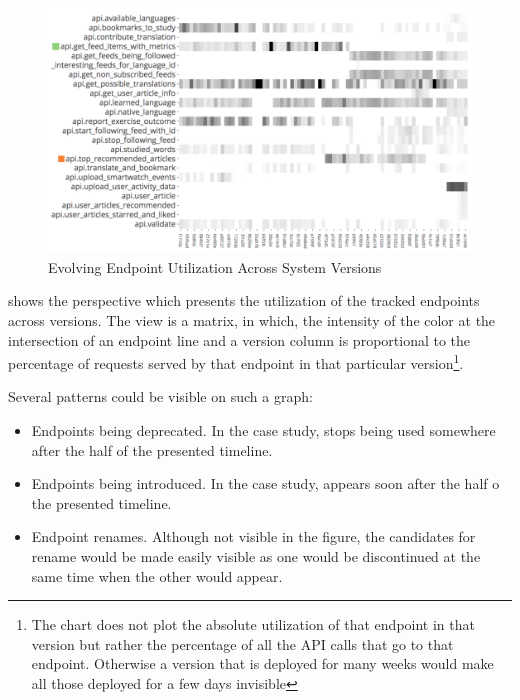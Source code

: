     \begin{figure}[h!]
      \centering
      \includegraphics[width=\linewidth]{utilization-evolution.pdf}
      \caption{Evolving Endpoint Utilization Across System Versions}
      \label{fig:mv-util}
    \end{figure}

   shows the  perspective which presents the utilization of the tracked endpoints across versions. The view is a matrix, in which, the intensity of the color at the intersection of an endpoint line and a version column is proportional to the percentage of requests served by that endpoint in that particular version\footnote{The chart does not plot the absolute utilization of that endpoint in that version but rather the percentage of all the API calls that go to that endpoint. Otherwise a version that is deployed for many weeks would make all those deployed for a few days invisible}.

  Several patterns could be visible on such a graph:
  \begin{itemize}
    
    \item Endpoints being deprecated. In the case study, \epFeedItemsColor stops being used somewhere after the half of the presented timeline.

    \item Endpoints being introduced. In the case study, \epTopArticlesColor appears soon after the half o the presented timeline. 

    \item Endpoint renames. Although not visible in the figure, the candidates for rename would be made easily visible as one would be discontinued at the same time when the other would appear. 

  \end{itemize}


